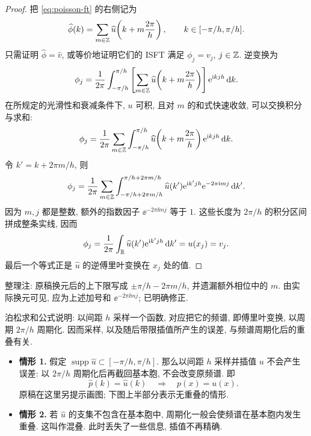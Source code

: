 \begin{proof}
把 \eqref{eq:poisson-ft} 的右侧记为
\[
\widehat\phi(k)=\sum_{m\in\mathbb Z}\widehat u\!\left(k+m\frac{2\pi}h\right),
\qquad k\in[-\pi/h,\pi/h].
\]
只需证明 $\widehat\phi=\widehat v$, 或等价地证明它们的 ISFT 满足 $\phi_j=v_j$, $j\in\mathbb Z$. 逆变换为
\[
\phi_j=\frac1{2\pi}\int_{-\pi/h}^{\pi/h}
\left[\sum_{m\in\mathbb Z}\widehat u\!\left(k+m\frac{2\pi}h\right)\right]
\mathrm e^{\mathrm i kjh}\,\mathrm d k.
\]
在所规定的光滑性和衰减条件下, $u$ 可积, 且对 $m$ 的和式快速收敛, 可以交换积分与求和:
\[
\phi_j=\frac1{2\pi}\sum_{m\in\mathbb Z}\int_{-\pi/h}^{\pi/h}
\widehat u\!\left(k+m\frac{2\pi}h\right)\mathrm e^{\mathrm i kjh}\,\mathrm d k.
\]
令 $k'=k+2\pi m/h$, 则
\[
\phi_j=\frac1{2\pi}\sum_{m\in\mathbb Z}
\int_{-\pi/h+2\pi m/h}^{\pi/h+2\pi m/h}
\widehat u(k')\mathrm e^{\mathrm i k'jh}\mathrm e^{-2\pi\mathrm i mj}\,\mathrm d k'.
\]
因为 $m,j$ 都是整数, 额外的指数因子 $\ee^{-2\pi\ii mj}$ 等于 $1$. 这些长度为 $2\pi/h$ 的积分区间拼成整条实线, 因而
\[
\phi_j=\frac1{2\pi}\int_{\mathbb R}\widehat u(k')\mathrm e^{\mathrm i k'jh}\,\mathrm d k'
=u(x_j)=v_j.
\]
最后一个等式正是 $\widehat u$ 的逆傅里叶变换在 $x_j$ 处的值.
\end{proof}
\begin{remark}
整理注: 原稿换元后的上下限写成 $\pm\pi/h-2\pi m/h$, 并遗漏额外相位中的 $m$. 由实际换元可见, 应为上述加号和 $\ee^{-2\pi\ii mj}$; 已明确修正.
\end{remark}

泊松求和公式说明: 以间距 $h$ 采样一个函数, 对应把它的频谱, 即傅里叶变换, 以周期 $2\pi/h$ 周期化. 因而采样, 以及随后带限插值所产生的误差, 与频谱周期化后的重叠有关.
\begin{itemize}
\item \textbf{情形 1.} 假定 $\operatorname{supp}\widehat u\subset[-\pi/h,\pi/h]$. 那么以间距 $h$ 采样并插值 $u$ 不会产生误差: 以 $2\pi/h$ 周期化后再截回基本胞, 不会改变原频谱. 即
\[
\widehat p(k)=\widehat u(k)\quad\Longrightarrow\quad p(x)=u(x).
\]
原稿在这里另提示画图; 下图上半部分表示无重叠的情形.
\item \textbf{情形 2.} 若 $\widehat u$ 的支集不包含在基本胞中, 周期化一般会使频谱在基本胞内发生重叠. 这叫作混叠. 此时丢失了一些信息, 插值不再精确.
\end{itemize}

